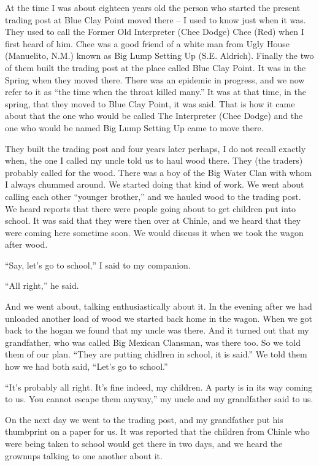 At the time I was about eighteen years old the person who started the present trading post at Blue Clay Point moved there -- I used to know just when it was. They used to call the Former Old Interpreter (Chee Dodge) Chee (Red) when I first heard of him. Chee was a good friend of a white man from Ugly House (Manuelito, N.M.) known as Big Lump Setting Up (S.E. Aldrich). Finally the two of them built the trading post at the place called Blue Clay Point. It was in the Spring when they moved there. There was an epidemic in progress, and we now refer to it as ``the time when the throat killed many.'' It was at that time, in the spring, that they moved to Blue Clay Point, it was said. That is how it came about that the one who would be called The Interpreter (Chee Dodge) and the one who would be named Big Lump Setting Up came to move there.

They built the trading post and four years later perhaps, I do not recall exactly when, the one I called my uncle told us to haul wood there. They (the traders) probably called for the wood.
There was a boy of the Big Water Clan with whom I always chummed around. We started doing that kind of work. We went about calling each other ``younger brother,'' and we hauled wood to the trading post. We heard reports that there were people going about to get children put into school. It was said that they were then over at Chinle, and we heard that they were coming here sometime soon. We would discuss it when we took the wagon after wood.

``Say, let's go to school,'' I said to my companion.

``All right,'' he said.

And we went about, talking enthusiastically about it. In the evening after we had unloaded another load of wood we started back home in the wagon. When we got back to the hogan we found that my uncle was there. And it turned out that my grandfather, who was called Big Mexican Clansman, was there too. So we told them of our plan. ``They are putting chidlren in school, it is said.'' We told them how we had both said, ``Let's go to school.''

``It's probably all right. It's fine indeed, my children. A party is in its way coming to us. You cannot escape them anyway,'' my uncle and my grandfather said to us.

On the next day we went to the trading post, and my grandfather put his thumbprint on a paper for us. It was reported that the children from Chinle who were being taken to school would get there in two days, and we heard the grownups talking to one another about it.

